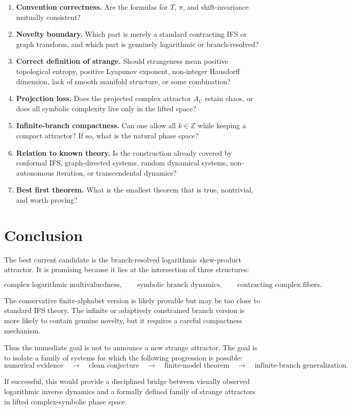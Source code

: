 \documentclass[12pt]{article}
\newcommand{\C}{\mathbb{C}}
\newcommand{\Z}{\mathbb{Z}}
\begin{document}
	\begin{enumerate}
		\item \textbf{Convention correctness.}
		Are the formulas for \(T\), \(\pi\), and shift-invariance mutually consistent?
		
		\item \textbf{Novelty boundary.}
		Which part is merely a standard contracting IFS or graph transform, and which part is genuinely logarithmic or branch-resolved?
		
		\item \textbf{Correct definition of strange.}
		Should strangeness mean positive topological entropy, positive Lyapunov exponent, non-integer Hausdorff dimension, lack of smooth manifold structure, or some combination?
		
		\item \textbf{Projection loss.}
		Does the projected complex attractor \(A_{\C}\) retain chaos, or does all symbolic complexity live only in the lifted space?
		
		\item \textbf{Infinite-branch compactness.}
		Can one allow all \(k\in\Z\) while keeping a compact attractor? If so, what is the natural phase space?
		
		\item \textbf{Relation to known theory.}
		Is the construction already covered by conformal IFS, graph-directed systems, random dynamical systems, non-autonomous iteration, or transcendental dynamics?
		
		\item \textbf{Best first theorem.}
		What is the smallest theorem that is true, nontrivial, and worth proving?
	\end{enumerate}
	
	\section{Conclusion}
	
	The best current candidate is the branch-resolved logarithmic skew-product attractor. It is promising because it lies at the intersection of three structures:
	
	\[
	\text{complex logarithmic multivaluedness},
	\qquad
	\text{symbolic branch dynamics},
	\qquad
	\text{contracting complex fibers}.
	\]
	
	The conservative finite-alphabet version is likely provable but may be too close to standard IFS theory. The infinite or adaptively constrained branch version is more likely to contain genuine novelty, but it requires a careful compactness mechanism.
	
	Thus the immediate goal is not to announce a new strange attractor. The goal is to isolate a family of systems for which the following progression is possible:
	\[
	\text{numerical evidence}
	\quad\longrightarrow\quad
	\text{clean conjecture}
	\quad\longrightarrow\quad
	\text{finite-model theorem}
	\quad\longrightarrow\quad
	\text{infinite-branch generalization}.
	\]
	
	If successful, this would provide a disciplined bridge between visually observed logarithmic inverse dynamics and a formally defined family of strange attractors in lifted complex-symbolic phase space.
	
\end{document}
